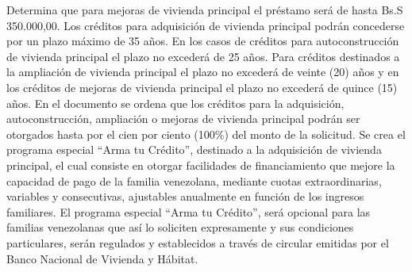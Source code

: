 \documentclass{article}%
\begin{document}
\newline%
Determina que para mejoras de vivienda principal el préstamo será de hasta Bs.S  350.000,00.\newline%
\newline%
Los créditos para adquisición de vivienda principal podrán concederse por un plazo máximo de 35 años.\newline%
\newline%
En los casos de créditos para autoconstrucción de vivienda principal el plazo no excederá de 25 años.\newline%
\newline%
Para créditos destinados a la ampliación de vivienda principal el plazo no excederá de veinte (20) años y en los créditos de mejoras de vivienda principal el plazo no excederá de quince (15) años.%
\newline%
%
En el documento se ordena que los créditos para la adquisición, autoconstrucción, ampliación o mejoras de vivienda principal podrán ser otorgados hasta por el cien por ciento (100\%) del monto de la solicitud.\newline%
\newline%
Se crea el programa especial “Arma tu Crédito”, destinado a la adquisición de vivienda principal, el cual consiste en otorgar facilidades de financiamiento que mejore la capacidad de pago de la familia venezolana, mediante cuotas extraordinarias, variables y consecutivas, ajustables anualmente en función de los ingresos familiares.\newline%
\newline%
El programa especial “Arma tu Crédito”, será opcional para las familias venezolanas que así lo soliciten expresamente y sus condiciones particulares, serán regulados y establecidos a través de circular emitidas por el Banco Nacional de Vivienda y Hábitat.%
\newline%
%
\end{document}
